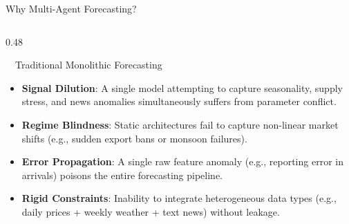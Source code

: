 \documentclass{beamer}
\begin{document}

\begin{frame}{Why Multi-Agent Forecasting?}
\vspace{-0.2cm}

\begin{columns}[T]
    \begin{column}{0.48\textwidth}
        \begin{alertcard}[height=5.2cm]{~~Traditional Monolithic Forecasting}
            \fontsize{7pt}{8.5pt}\selectfont
            \begin{itemize}\setlength\itemsep{4pt}\setlength\parskip{0pt}
                \item \textbf{Signal Dilution}: A single model attempting to capture seasonality, supply stress, and news anomalies simultaneously suffers from parameter conflict.
                \item \textbf{Regime Blindness}: Static architectures fail to capture non-linear market shifts (e.g., sudden export bans or monsoon failures).
                \item \textbf{Error Propagation}: A single raw feature anomaly (e.g., reporting error in arrivals) poisons the entire forecasting pipeline.
                \item \textbf{Rigid Constraints}: Inability to integrate heterogeneous data types (e.g., daily prices + weekly weather + text news) without leakage.
            \end{itemize}
        \end{alertcard}
    \end{column}
    

\end{columns}
\end{frame}
\end{document}
